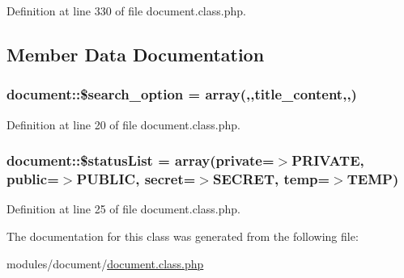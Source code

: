 Definition at line 330 of file document.\+class.\+php.



\subsection{Member Data Documentation}
\subsubsection[{\texorpdfstring{\$search\+\_\+option}{$search_option}}]{\setlength{\rightskip}{0pt plus 5cm}document\+::\$search\+\_\+option = array(\textquotesingle{},\textquotesingle{},\textquotesingle{}title\+\_\+content\textquotesingle{},\textquotesingle{},)}\hypertarget{classdocument_adfef00d8f028ef4dfe991de199009d46}{}\label{classdocument_adfef00d8f028ef4dfe991de199009d46}


Definition at line 20 of file document.\+class.\+php.

\subsubsection[{\texorpdfstring{\$status\+List}{$statusList}}]{\setlength{\rightskip}{0pt plus 5cm}document\+::\$status\+List = array(\textquotesingle{}private\textquotesingle{}=$>$\textquotesingle{}P\+R\+I\+V\+A\+TE\textquotesingle{}, \textquotesingle{}public\textquotesingle{}=$>$\textquotesingle{}P\+U\+B\+L\+IC\textquotesingle{}, \textquotesingle{}secret\textquotesingle{}=$>$\textquotesingle{}S\+E\+C\+R\+ET\textquotesingle{}, \textquotesingle{}temp\textquotesingle{}=$>$\textquotesingle{}T\+E\+MP\textquotesingle{})}\hypertarget{classdocument_a93e1c85a4ec17a1471b874fdb14cce58}{}\label{classdocument_a93e1c85a4ec17a1471b874fdb14cce58}


Definition at line 25 of file document.\+class.\+php.



The documentation for this class was generated from the following file\+:\begin{DoxyCompactItemize}
\item 
modules/document/\hyperlink{document_8class_8php}{document.\+class.\+php}\end{DoxyCompactItemize}
